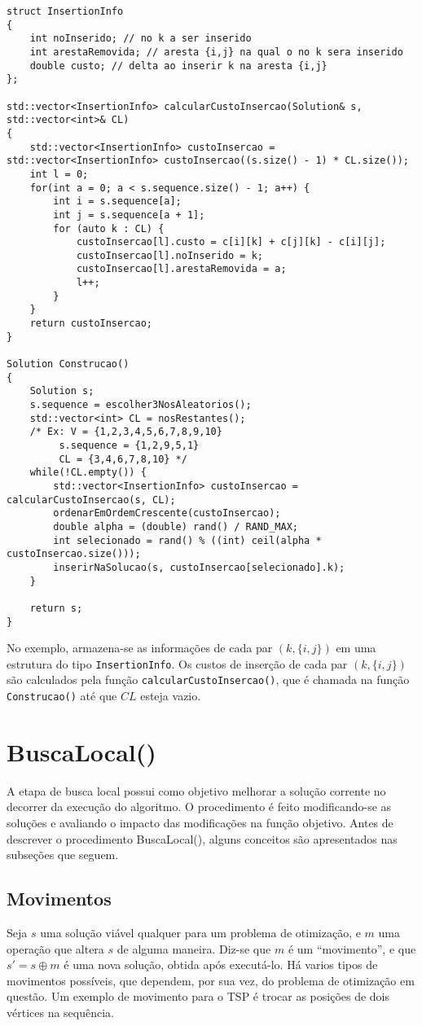 \begin{lstlisting}[style=cplusplusListStyle]
struct InsertionInfo
{
	int noInserido; // no k a ser inserido
	int arestaRemovida; // aresta {i,j} na qual o no k sera inserido
	double custo; // delta ao inserir k na aresta {i,j}
};
    
std::vector<InsertionInfo> calcularCustoInsercao(Solution& s, std::vector<int>& CL)
{
	std::vector<InsertionInfo> custoInsercao = std::vector<InsertionInfo> custoInsercao((s.size() - 1) * CL.size());
	int l = 0;	
	for(int a = 0; a < s.sequence.size() - 1; a++) {
		int i = s.sequence[a];
		int j = s.sequence[a + 1];
		for (auto k : CL) {
			custoInsercao[l].custo = c[i][k] + c[j][k] - c[i][j];
			custoInsercao[l].noInserido = k;
			custoInsercao[l].arestaRemovida = a;
			l++;
		}
	}
	return custoInsercao;
}

Solution Construcao()
{
	Solution s;
	s.sequence = escolher3NosAleatorios();
	std::vector<int> CL = nosRestantes();
	/* Ex: V = {1,2,3,4,5,6,7,8,9,10}
		 s.sequence = {1,2,9,5,1} 
		 CL = {3,4,6,7,8,10} */
	while(!CL.empty()) {
		std::vector<InsertionInfo> custoInsercao = calcularCustoInsercao(s, CL);
		ordenarEmOrdemCrescente(custoInsercao);
		double alpha = (double) rand() / RAND_MAX;
		int selecionado = rand() % ((int) ceil(alpha * custoInsercao.size()));
		inserirNaSolucao(s, custoInsercao[selecionado].k);
	}

    return s;
}
\end{lstlisting}

No exemplo, armazena-se as informações de cada par \((k, \{i,j\})\) em uma estrutura do tipo \texttt{InsertionInfo}. Os custos de inserção de cada par \((k, \{i,j\})\) são calculados pela função \texttt{calcularCustoInsercao()}, que é chamada na função \texttt{Construcao()} até que $CL$ esteja vazio.


\section{BuscaLocal()}
A etapa de busca local possui como objetivo melhorar a solução corrente no decorrer da execução do algoritmo. O procedimento é feito modificando-se as soluções e avaliando o impacto das modificações na função objetivo. Antes de descrever o procedimento BuscaLocal(), alguns conceitos são apresentados nas subseções que seguem.

\subsection{Movimentos}
Seja \(s\) uma solução viável qualquer para um problema de otimização, e \(m\) uma operação que altera \(s\) de alguma maneira. Diz-se que \(m\) é um ``movimento'', e que \(s' =  s \oplus m \) é  uma nova solução, obtida após executá-lo. Há varios tipos de movimentos possíveis, que dependem, por sua vez, do problema de otimização em questão. Um exemplo de movimento para o TSP é trocar as posições de dois vértices na sequência.

